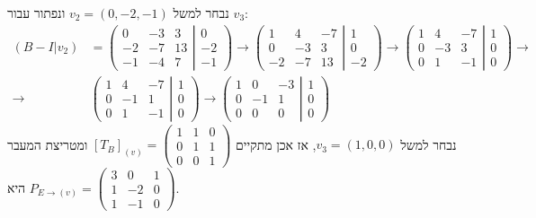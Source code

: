 \documentclass{article}
\begin{document}
נבחר למשל $v_2=(0, -2, -1)$ ונפתור עבור $v_3$:
\begin{align*}
    (B-I | v_2) & =
    \left(
    \begin{matrix}
        0  & -3 & 3  \\
        -2 & -7 & 13 \\
        -1 & -4 & 7
    \end{matrix}
    \left|
    \begin{matrix}
        0  \\
        -2 \\
        -1
    \end{matrix}
    \right.
    \right)\rightarrow
    \left(
    \begin{matrix}
        1  & 4  & -7 \\
        0  & -3 & 3  \\
        -2 & -7 & 13
    \end{matrix}
    \left|
    \begin{matrix}
        1 \\
        0 \\
        -2
    \end{matrix}
    \right.
    \right)\rightarrow
    \left(
    \begin{matrix}
        1 & 4  & -7 \\
        0 & -3 & 3  \\
        0 & 1  & -1
    \end{matrix}
    \left|
    \begin{matrix}
        1 \\
        0 \\
        0
    \end{matrix}
    \right.
    \right)\rightarrow \\
    \rightarrow &
    \left(
    \begin{matrix}
        1 & 4  & -7 \\
        0 & -1 & 1  \\
        0 & 1  & -1
    \end{matrix}
    \left|
    \begin{matrix}
        1 \\
        0 \\
        0
    \end{matrix}
    \right.
    \right)\rightarrow
    \left(
    \begin{matrix}
        1 & 0  & -3 \\
        0 & -1 & 1  \\
        0 & 0  & 0
    \end{matrix}
    \left|
    \begin{matrix}
        1 \\
        0 \\
        0
    \end{matrix}
    \right.
    \right)
\end{align*}
נבחר למשל $v_3=(1,0,0)$, אז אכן מתקיים $[T_B]_{(v)}=\begin{pmatrix}
        1 & 1 & 0 \\
        0 & 1 & 1 \\
        0 & 0 & 1
    \end{pmatrix}$ ומטריצת המעבר היא $P_{E\rightarrow (v)}=\begin{pmatrix}
        3 & 0  & 1 \\
        1 & -2 & 0 \\
        1 & -1 & 0
    \end{pmatrix}$.
\end{document}
